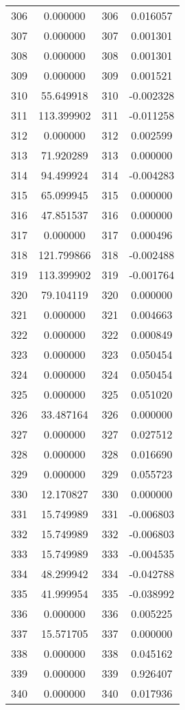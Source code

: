 \documentclass[12pt]{article}
\begin{document}
\begin{longtable}{@{}cccc@{}}
306 & 0.000000 & 306 & 0.016057 \\
307 & 0.000000 & 307 & 0.001301 \\
308 & 0.000000 & 308 & 0.001301 \\
309 & 0.000000 & 309 & 0.001521 \\
310 & 55.649918 & 310 & -0.002328 \\
311 & 113.399902 & 311 & -0.011258 \\
312 & 0.000000 & 312 & 0.002599 \\
313 & 71.920289 & 313 & 0.000000 \\
314 & 94.499924 & 314 & -0.004283 \\
315 & 65.099945 & 315 & 0.000000 \\
316 & 47.851537 & 316 & 0.000000 \\
317 & 0.000000 & 317 & 0.000496 \\
318 & 121.799866 & 318 & -0.002488 \\
319 & 113.399902 & 319 & -0.001764 \\
320 & 79.104119 & 320 & 0.000000 \\
321 & 0.000000 & 321 & 0.004663 \\
322 & 0.000000 & 322 & 0.000849 \\
323 & 0.000000 & 323 & 0.050454 \\
324 & 0.000000 & 324 & 0.050454 \\
325 & 0.000000 & 325 & 0.051020 \\
326 & 33.487164 & 326 & 0.000000 \\
327 & 0.000000 & 327 & 0.027512 \\
328 & 0.000000 & 328 & 0.016690 \\
329 & 0.000000 & 329 & 0.055723 \\
330 & 12.170827 & 330 & 0.000000 \\
331 & 15.749989 & 331 & -0.006803 \\
332 & 15.749989 & 332 & -0.006803 \\
333 & 15.749989 & 333 & -0.004535 \\
334 & 48.299942 & 334 & -0.042788 \\
335 & 41.999954 & 335 & -0.038992 \\
336 & 0.000000 & 336 & 0.005225 \\
337 & 15.571705 & 337 & 0.000000 \\
338 & 0.000000 & 338 & 0.045162 \\
339 & 0.000000 & 339 & 0.926407 \\
340 & 0.000000 & 340 & 0.017936 \\

\end{longtable}
\end{document}
